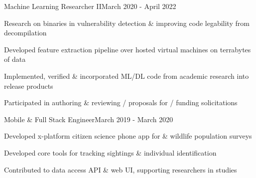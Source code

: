 \documentclass{article}
\newenvironment{**mylist}[2]{

\subsubsection*{#1\hfill#2}
  \small
  \begin{list}{}{}
    \setlength{\topsep}{.2pt}
   \setlength{\itemsep}{.8pt}
   \setlength{\parskip}{0pt}
   \setlength{\parsep}{0pt}}{\end{list}\normalsize}
\newcommand{\LU}[1]{\hspace{-1em}{\bf Technologies : #1}}
\begin{document}
\begin{**mylist}{\href{https://www.grammatech.com}{} \tabb Machine Learning Researcher II}{March 2020 - April 2022}
\item Research on binaries in vulnerability detection \& improving code legability from decompilation
\item Developed feature extraction pipeline over hosted virtual machines on terrabytes of data
\item Implemented, verified \& incorporated ML/DL code from academic research into release products
\item Participated in authoring \& reviewing / proposals for / funding solicitations
\end{**mylist}

\begin{**mylist}{\href{www.happywhale.com}{} \tabb Mobile \& Full Stack Engineer}{March 2019 - March 2020}
\item Developed %
  x-platform citizen science phone app
  for
   \& wildlife population  surveys
\item Developed core tools for tracking  sightings \& individual  identification
\item Contributed to data access API \& web UI, supporting researchers in  studies
\end{**mylist}
\end{document}
